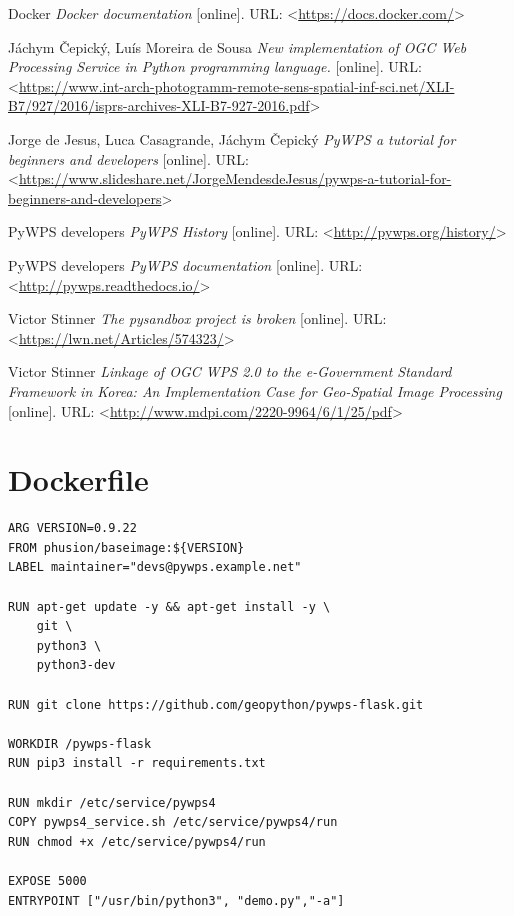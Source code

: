 \documentclass[12pt,a4paper]{article}
\begin{document}
\begin{thebibliography}{99}
Docker \textit{Docker documentation} [online].
URL: \textless\url{https://docs.docker.com/}\textgreater

Jáchym Čepický, Luís Moreira de Sousa \textit{New implementation of OGC Web Processing Service in Python programming language.} [online].
URL: \textless\url{https://www.int-arch-photogramm-remote-sens-spatial-inf-sci.net/XLI-B7/927/2016/isprs-archives-XLI-B7-927-2016.pdf}\textgreater

Jorge de Jesus, Luca Casagrande, Jáchym Čepický \textit{PyWPS a tutorial for beginners and developers} [online].
URL: \textless\url{https://www.slideshare.net/JorgeMendesdeJesus/pywps-a-tutorial-for-beginners-and-developers}\textgreater

PyWPS developers \textit{PyWPS History} [online].
URL: \textless\url{http://pywps.org/history/}\textgreater

PyWPS developers \textit{PyWPS documentation} [online].
URL: \textless\url{http://pywps.readthedocs.io/}\textgreater

Victor Stinner \textit{The pysandbox project is broken} [online].
URL: \textless\url{https://lwn.net/Articles/574323/}\textgreater

Victor Stinner \textit{Linkage of OGC WPS 2.0 to the e-Government Standard Framework in Korea: An Implementation Case for Geo-Spatial Image Processing} [online].
URL: \textless\url{http://www.mdpi.com/2220-9964/6/1/25/pdf}\textgreater
\end{thebibliography}

\appendix

\newpage
\section{Dockerfile}
\begin{lstlisting}[basicstyle=\small,caption={Dockerfile example}]
ARG VERSION=0.9.22
FROM phusion/baseimage:${VERSION}
LABEL maintainer="devs@pywps.example.net"

RUN apt-get update -y && apt-get install -y \
	git \
	python3 \
	python3-dev

RUN git clone https://github.com/geopython/pywps-flask.git
 
WORKDIR /pywps-flask
RUN pip3 install -r requirements.txt

RUN mkdir /etc/service/pywps4
COPY pywps4_service.sh /etc/service/pywps4/run
RUN chmod +x /etc/service/pywps4/run

EXPOSE 5000
ENTRYPOINT ["/usr/bin/python3", "demo.py","-a"]
\end{lstlisting}
\end{document}
